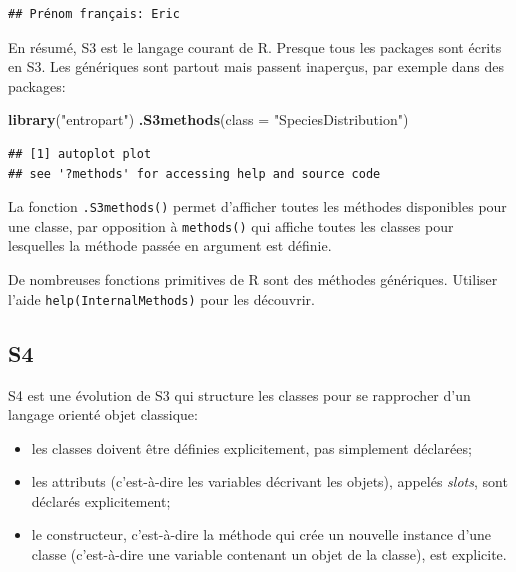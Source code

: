 \documentclass[
  12pt,
  french,
  a4paper,
  extrafontsizes,onecolumn,openright
  ]{memoir}
\newenvironment{Shaded}{\begin{snugshade}}{\end{snugshade}}
\newcommand{\DataTypeTok}[1]{\textcolor[rgb]{0.13,0.29,0.53}{#1}}
\newcommand{\KeywordTok}[1]{\textcolor[rgb]{0.13,0.29,0.53}{\textbf{#1}}}
\newcommand{\NormalTok}[1]{#1}
\newcommand{\StringTok}[1]{\textcolor[rgb]{0.31,0.60,0.02}{#1}}
\providecommand{\tightlist}{%
  \setlength{\itemsep}{0pt}\setlength{\parskip}{0pt}}
\begin{document}
\begin{verbatim}
## Prénom français: Eric
\end{verbatim}

\normalsize

En résumé, S3 est le langage courant de R.
Presque tous les packages sont écrits en S3.
Les génériques sont partout mais passent inaperçus, par exemple dans des packages:

\scriptsize

\begin{Shaded}
\begin{Highlighting}[]
\KeywordTok{library}\NormalTok{(}\StringTok{"entropart"}\NormalTok{)}
\KeywordTok{.S3methods}\NormalTok{(}\DataTypeTok{class =} \StringTok{"SpeciesDistribution"}\NormalTok{)}
\end{Highlighting}
\end{Shaded}

\begin{verbatim}
## [1] autoplot plot    
## see '?methods' for accessing help and source code
\end{verbatim}

\normalsize
La fonction \texttt{.S3methods()} permet d'afficher toutes les méthodes disponibles pour une classe, par opposition à \texttt{methods()} qui affiche toutes les classes pour lesquelles la méthode passée en argument est définie.

De nombreuses fonctions primitives de R sont des méthodes génériques.
Utiliser l'aide \texttt{help(InternalMethods)} pour les découvrir.

\hypertarget{s4}{%
\subsection{S4}\label{s4}}

S4 est une évolution de S3 qui structure les classes pour se rapprocher d'un langage orienté objet classique:

\begin{itemize}
\tightlist
\item
  les classes doivent être définies explicitement, pas simplement déclarées;
\item
  les attributs (c'est-à-dire les variables décrivant les objets), appelés \emph{slots}, sont déclarés explicitement;
\item
  le constructeur, c'est-à-dire la méthode qui crée un nouvelle instance d'une classe (c'est-à-dire une variable contenant un objet de la classe), est explicite.
\end{itemize}
\end{document}
